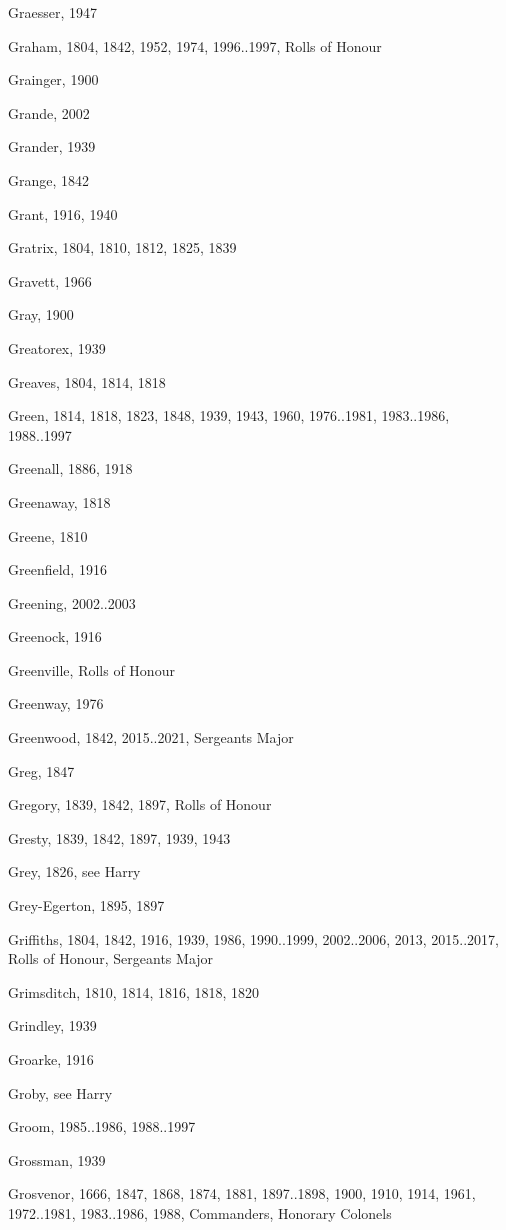 {\begin{theindex}
\item Graesser, 1947
\item Graham, 1804, 1842, 1952, 1974, 1996..1997, Rolls of Honour
\item Grainger, 1900
\item Grande, 2002
\item Grander, 1939
\item Grange, 1842
\item Grant, 1916, 1940
\item Gratrix, 1804, 1810, 1812, 1825, 1839
\item Gravett, 1966
\item Gray, 1900
\item Greatorex, 1939
\item Greaves, 1804, 1814, 1818
\item Green, 1814, 1818, 1823, 1848, 1939, 1943, 1960, 1976..1981, 1983..1986, 1988..1997
\item Greenall, 1886, 1918
\item Greenaway, 1818
\item Greene, 1810
\item Greenfield, 1916
\item Greening, 2002..2003
\item Greenock, 1916
\item Greenville, Rolls of Honour
\item Greenway, 1976
\item Greenwood, 1842, 2015..2021, Sergeants Major
\item Greg, 1847
\item Gregory, 1839, 1842, 1897, Rolls of Honour
\item Gresty, 1839, 1842, 1897, 1939, 1943
\item Grey, 1826, see Harry
\item Grey-Egerton, 1895, 1897
\item Griffiths, 1804, 1842, 1916, 1939, 1986, 1990..1999, 2002..2006, 2013, 2015..2017, Rolls of Honour, Sergeants Major
\item Grimsditch, 1810, 1814, 1816, 1818, 1820
\item Grindley, 1939
\item Groarke, 1916
\item Groby, see Harry
\item Groom, 1985..1986, 1988..1997
\item Grossman, 1939
\item Grosvenor, 1666, 1847, 1868, 1874, 1881, 1897..1898, 1900, 1910, 1914, 1961, 1972..1981, 1983..1986, 1988, Commanders, Honorary Colonels

\end{theindex}}
